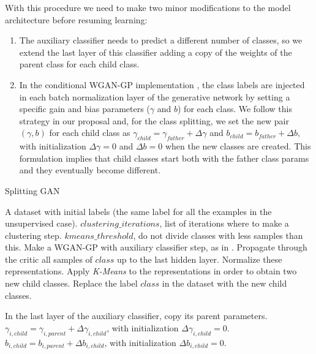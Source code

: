 \documentclass[times,twocolumn]{article}
\begin{document}
With this procedure we need to make two minor modifications to the model architecture before resuming learning: 
\begin{enumerate}
\item The auxiliary classifier needs to predict a different number of classes, so we extend the last layer of this classifier adding a copy of the weights of the parent class for each child class.
\item In the conditional WGAN-GP implementation \cite{Gulrajani2017github}, the class labels are injected in each batch normalization layer of the generative network by setting a specific gain and bias parameters ($\gamma$ and $b$) for each class. We follow this strategy in our proposal and, for the class splitting, we set the new pair $(\gamma,b)$ for each child class as $\gamma_{child} = \gamma_{father} + \Delta\gamma$ and $b_{child} = b_{father} + \Delta b$, with initialization $\Delta\gamma=0$ and $\Delta b=0$ when the new classes are created. This formulation implies that child classes start both with the father class params and they eventually become different.  
\end{enumerate}

\begin{algorithm}
	\caption{Splitting GAN}
	\label{alg:splitting}
	\begin{algorithmic}
	\REQUIRE A dataset with initial labels (the same label for all the examples in the unsupervised case).
	\REQUIRE $clustering\_iterations$, list of iterations where to make a clustering step.
	\REQUIRE $kmeans\_threshold$, do not divide classes with less samples than this.
    	\STATE Make a WGAN-GP with auxiliary classifier step, as in \cite{Gulrajani2017}.
          	\STATE Propagate through the critic all samples of $class$ up to the last hidden layer.
          	\STATE Normalize these representations.
          	\STATE Apply \emph{K-Means} to the representations in order to obtain two new child classes.
          	\STATE Replace the label $class$ in the dataset with the new child classes.
      	\ENDFOR
     	 
          	\STATE In the last layer of the auxiliary classifier, copy its parent parameters.
             	\STATE $\gamma_{i,child} = \gamma_{i,parent} + \Delta\gamma_{i,child}$, with initialization $\Delta\gamma_{i,child} = 0$.
             	\STATE $b_{i,child} = b_{i,parent} + \Delta b_{i,child}$, with initialization $\Delta b_{i,child} = 0$.
          	\ENDFOR
      	\ENDFOR
    	\ENDIF
    \ENDWHILE
	\end{algorithmic}
\end{algorithm}
\end{document}
